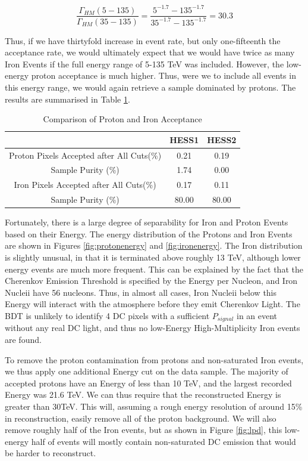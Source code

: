 \documentclass[11pt]{article}
\begin{document}
\[ \frac{\Gamma_{HM}(5-135)}{\Gamma_{HM}(35-135)} = \frac{5^{-1.7} - 135^{-1.7}}{35^{-1.7} - 135^{-1.7}} 
= 30.3 \]

Thus, if we have thirtyfold increase in event rate, but only one-fifteenth the acceptance rate, we would ultimately expect that we would have twice as many Iron Events if the full energy range of 5-135 TeV was included. However, the low-energy proton acceptance is much higher. Thus, were we to include all events in this energy range, we would again retrieve a sample dominated by protons. The results are summarised in Table \ref{tab:fullironacceptance}. 

\begin{table}[h!]
  \centering
  \caption{Comparison of Proton and Iron Acceptance}
  \label{tab:fullironacceptance}
  \begin{tabular}{ccc}
    \toprule
    & HESS1  & HESS2 \\
    \midrule
    Proton Pixels Accepted after All Cuts(\%) & 0.21 & 0.19\\
    Sample Purity (\%) & 1.74 & 0.00 \\
    \midrule
    Iron Pixels Accepted after All Cuts(\%) & 0.17 & 0.11\\
    Sample Purity (\%) & 80.00 & 80.00 \\
    \bottomrule
  \end{tabular}
\end{table}

Fortunately, there is a large degree of separability for Iron and Proton Events based on their Energy. The energy distribution of the Protons and Iron Events are shown in Figures \ref{fig:protonenergy} and \ref{fig:ironenergy}. The Iron distribution is slightly unusual, in that it is terminated above roughly 13 TeV, although lower energy events are much more frequent. This can be explained by the fact that the Cherenkov Emission Threshold is specified by the Energy per Nucleon, and Iron Nucleii have 56 nucleons. Thus, in almost all cases, Iron Nucleii below this Energy will interact with the atmosphere before they emit Cherenkov Light. The BDT is unlikely to identify 4 DC pixels with a sufficient $P_{signal}$ in an event without any real DC light, and thus no low-Energy High-Multiplicity Iron events are found. 

To remove the proton contamination from protons and non-saturated Iron events, we thus apply one additional Energy cut on the data sample. The majority of accepted protons have an Energy of less than 10 TeV, and the largest recorded Energy was 21.6 TeV. We can thus require that the reconstructed Energy is greater than 30TeV. This will, assuming a rough energy resolution of around 15\% in reconstruction, easily remove all of the proton background. We will also remove roughly half of the Iron events, but as shown in Figure \ref{fig:lpd}, this low-energy half of events will mostly contain non-saturated DC emission that would be harder to reconstruct.
\end{document}
